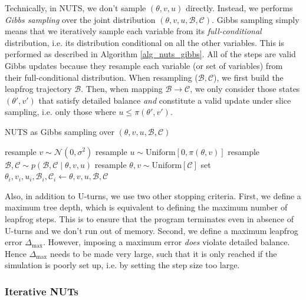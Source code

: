 \documentclass[12pt]{article}
\begin{document}
Technically, in NUTS, we don't sample $(\theta,v,u)$ directly. Instead, we performs \textit{Gibbs sampling} over the joint distribution $(\theta, v, u, \mathcal{B}, \mathcal{C})$. Gibbs sampling simply means that we iteratively sample each variable from its \textit{full-conditional} distribution, i.e. its distribution conditional on all the other variables. This is performed as described in Algorithm \ref{alg_nuts_gibbs}. All of the steps are valid Gibbs updates because they resample each variable (or set of variables) from their full-conditional distribution. When resampling ($\mathcal{B}, \mathcal{C}$), we first build the leapfrog trajectory $\mathcal{B}$. Then, when mapping $\mathcal{B} \rightarrow \mathcal{C}$, we only consider those states $(\theta', v')$ that satisfy detailed balance \textit{and} constitute a valid update under slice sampling, i.e. only those where $u \leq \pi(\theta', v')$.

\begin{algorithm}
\caption{NUTS as Gibbs sampling over $(\theta, v, u, \mathcal{B}, \mathcal{C})$}
\label{alg_nuts_gibbs}
\begin{algorithmic}
	\State resample $v \sim \mathcal{N}(0, \sigma^2)$
	\State resample $u \sim \text{Uniform} [0, \pi(\theta, v)]$
	\State resample $\mathcal{B}, \mathcal{C} \sim p(\mathcal{B}, \mathcal{C} \mid \theta, v, u)$
	\State resample $\theta, v \sim \text{Uniform}[\mathcal{C}]$
	\State set $\theta_i, v_i, u_i, \mathcal{B}_i, \mathcal{C}_i \gets \theta, v, u, \mathcal{B}, \mathcal{C}$
\EndFor
\end{algorithmic}
\end{algorithm}

Also, in addition to U-turns, we use two other stopping criteria. First, we define a maximum tree depth, which is equivalent to defining the maximum number of leapfrog steps. This is to ensure that the program terminates even in absence of U-turns and we don't run out of memory. Second, we define a maximum leapfrog error $\Delta_\text{max}$. However, imposing a maximum error \textit{does} violate detailed balance. Hence $\Delta_\text{max}$ needs to be made very large, such that it is only reached if the simulation is poorly set up, i.e. by setting the step size too large.

\subsubsection{Iterative NUTs}
\end{document}
